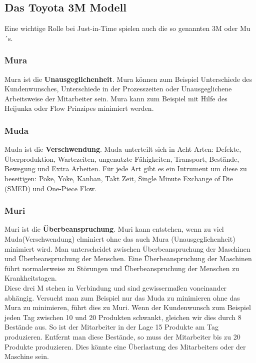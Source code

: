 \documentclass[00_ToyotaProduktionssystem.tex]{subfiles}
\begin{document}
\subsection{Das Toyota 3M Modell}
Eine wichtige Rolle bei Just-in-Time spielen auch die so genannten 3M oder Mu´s.
\subsubsection{Mura}
Mura ist die \textbf{Unausgeglichenheit}. Mura können zum Beispiel Unterschiede des Kundenwunsches, Unterschiede in der Prozesszeiten oder Unausgeglichene Arbeitsweise der Mitarbeiter sein. Mura kann zum Beispiel mit Hilfe des Heijunka oder Flow Prinzipes minimiert werden.
\subsubsection{Muda}
Muda ist die \textbf{Verschwendung}. Muda unterteilt sich in Acht Arten: Defekte, Überproduktion, Wartezeiten, ungenutzte Fähigkeiten, Transport, Bestände, Bewegung und Extra Arbeiten. Für jede Art gibt es ein Intrument um diese zu beseitigen: Poke, Yoke, Kanban, Takt Zeit, Single Minute Exchange of Die (SMED) und One-Piece Flow.
\subsubsection{Muri}
Muri ist die \textbf{Überbeanspruchung}. Muri kann entstehen, wenn zu viel Muda(Verschwendung) elminiert ohne das auch Mura (Unausgeglichenheit) minimiert wird. Man unterscheidet zwischen Überbeanspruchung der Maschinen und Überbeanspruchung der Menschen. Eine Überbeanspruchung der Maschinen führt normalerweise zu Störungen und Überbeanspruchung der Menschen zu Krankheitstagen. \\ Diese drei M stehen in Verbindung und sind gewissermaßen voneinander abhängig. Versucht man zum Beispiel nur das Muda zu minimieren ohne das Mura zu minimieren, führt dies zu Muri. Wenn der Kundenwunsch zum Beispiel jeden Tag zwischen 10 und 20 Produkten schwankt, gleichen wir dies durch 8 Bestände aus. So ist der Mitarbeiter in der Lage 15 Produkte am Tag produzieren. Entfernt man diese Bestände, so muss der Mitarbeiter bis zu 20 Produkte produzieren. Dies könnte eine Überlastung des Mitarbeiters oder der Maschine sein.
\end{document}
